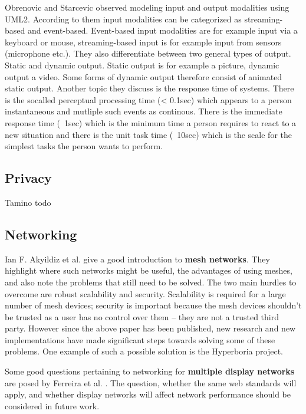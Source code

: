 Obrenovic and Starcevic \cite{obrenovic_modeling_2004} observed modeling input and output modalities using UML2.
According to them input modalities can be categorized as streaming-based and event-based.
Event-based input modalities are for example input via a keyboard or mouse, streaming-based input is for example input from sensors (microphone etc.).
They also differentiate between two general types of output.
Static and dynamic output.
Static output is for example a picture, dynamic output a video.
Some forms of dynamic output therefore consist of animated static output.
Another topic they discuss is the response time of systems.
There is the socalled perceptual processing time (< 0.1sec) which appears to a person instantaneous and mutliple such events as continous.
There is the immediate response time (~1sec) which is the minimum time a person requires to react to a new situation and there is the unit task time (~10sec) which is the scale for the simplest tasks the person wants to perform.

\subsection{Privacy}

Tamino todo

\subsection{Networking}

Ian F. Akyildiz et al. \cite{akyildiz2005survey} give a good introduction to \textbf{mesh networks}.
They highlight where such networks might be useful, the advantages of using meshes, and also note the problems that still need to be solved.
The two main hurdles to overcome are robust scalability and security.
Scalability is required for a large number of mesh devices; security is important because the mesh devices shouldn't be trusted as a user has no control over them – they are not a trusted third party.
However since the above paper has been published, new research and new implementations have made significant steps towards solving some of these problems.
One example of such a possible solution is the Hyperboria \cite{hyperboria} project.

Some good questions pertaining to networking for \textbf{multiple display networks} are posed by Ferreira et al. \cite{ferreira2012scalability}.
The question, whether the same web standards will apply, and whether display networks will affect network performance should be considered in future work.


